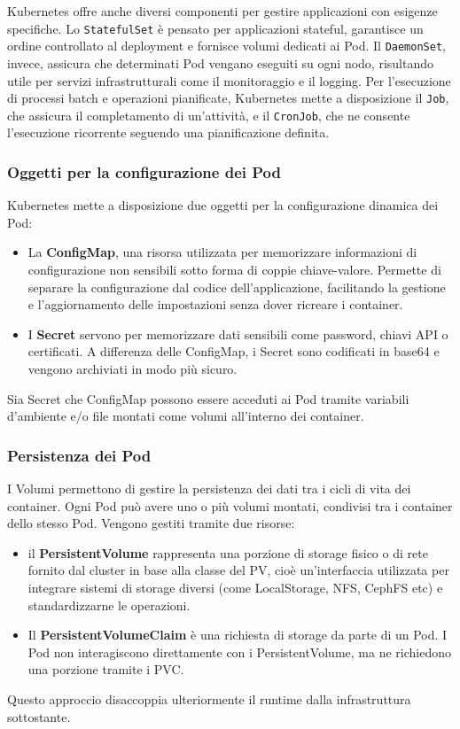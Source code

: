 Kubernetes offre anche diversi componenti per gestire applicazioni con esigenze specifiche. Lo \texttt{StatefulSet} è pensato per applicazioni stateful, garantisce un ordine controllato al deployment e fornisce volumi dedicati ai Pod. Il \texttt{DaemonSet}, invece, assicura che determinati Pod vengano eseguiti su ogni nodo, risultando utile per servizi infrastrutturali come il monitoraggio e il logging. Per l'esecuzione di processi batch e operazioni pianificate, Kubernetes mette a disposizione il \texttt{Job}, che assicura il completamento di un'attività, e il \texttt{CronJob}, che ne consente l'esecuzione ricorrente seguendo una pianificazione definita.

\subsubsection{Oggetti per la configurazione dei Pod}

Kubernetes mette a disposizione due oggetti per la configurazione dinamica dei Pod:

\begin{itemize}
    \item La \textbf{ConfigMap}, una risorsa utilizzata per memorizzare informazioni di configurazione non sensibili sotto forma di coppie chiave-valore. Permette di separare la configurazione dal codice dell'applicazione, facilitando la gestione e l'aggiornamento delle impostazioni senza dover ricreare i container.
    \item I \textbf{Secret} servono per memorizzare dati sensibili come password, chiavi API o certificati. A differenza delle ConfigMap, i Secret sono codificati in base64 e vengono archiviati in modo più sicuro.
\end{itemize}

Sia Secret che ConfigMap possono essere acceduti ai Pod tramite variabili d'ambiente e/o file montati come volumi all'interno dei container.

\subsubsection{Persistenza dei Pod}

I Volumi permettono di gestire la persistenza dei dati tra i cicli di vita dei container. Ogni Pod può avere uno o più volumi montati, condivisi tra i container dello stesso Pod. Vengono gestiti tramite due risorse:
\begin{itemize}
    \item il \textbf{PersistentVolume} rappresenta una porzione di storage fisico o di rete fornito dal cluster in base alla classe del PV, cioè un'interfaccia utilizzata per integrare sistemi di storage diversi (come LocalStorage, NFS, CephFS etc) e standardizzarne le operazioni.
    \item Il \textbf{PersistentVolumeClaim} è una richiesta di storage da parte di un Pod. I Pod non interagiscono direttamente con i PersistentVolume, ma ne richiedono una porzione tramite i PVC.
\end{itemize}
Questo approccio disaccoppia ulteriormente il runtime dalla infrastruttura sottostante.

